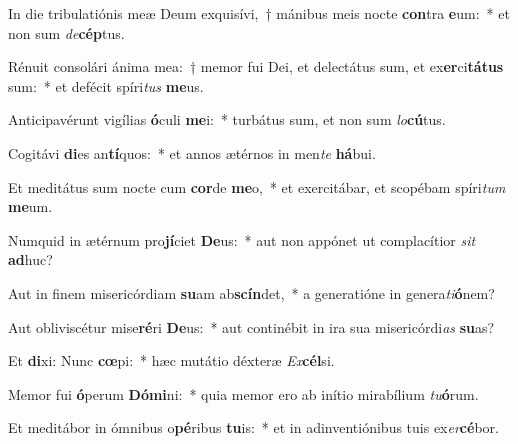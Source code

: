 \item In die tribulatiónis meæ Deum exquisívi,~† mánibus meis nocte \textbf{con}tra \textbf{e}um:~* et non sum \textit{de}\textbf{cép}tus.
\item Rénuit consolári ánima mea:~† memor fui Dei, et delectátus sum, et ex\textbf{er}ci\textbf{tá}\textbf{tus} sum:~* et defécit spíri\textit{tus} \textbf{me}us.
\item Anticipavérunt vigílias \textbf{ó}culi \textbf{me}i:~* turbátus sum, et non sum \textit{lo}\textbf{cú}tus.
\item Cogitávi \textbf{di}es an\textbf{tí}quos:~* et annos ætérnos in men\textit{te} \textbf{há}bui.
\item Et meditátus sum nocte cum \textbf{cor}de \textbf{me}o,~* et exercitábar, et scopébam spíri\textit{tum} \textbf{me}um.
\item Numquid in ætérnum pro\textbf{jí}ciet \textbf{De}us:~* aut non appónet ut complacítior \textit{sit} \textbf{ad}huc?
\item Aut in finem misericórdiam \textbf{su}am ab\textbf{scín}det,~* a generatióne in genera\textit{ti}\textbf{ó}nem?
\item Aut obliviscétur mise\textbf{ré}ri \textbf{De}us:~* aut continébit in ira sua misericórdi\textit{as} \textbf{su}as?
\item Et \textbf{di}xi: Nunc \textbf{cœ}pi:~* hæc mutátio déxteræ \textit{Ex}\textbf{cél}si.
\item Memor fui \textbf{ó}perum \textbf{Dó}\textbf{mi}ni:~* quia memor ero ab inítio mirabílium \textit{tu}\textbf{ó}rum.
\item Et meditábor in ómnibus o\textbf{pé}ribus \textbf{tu}is:~* et in adinventiónibus tuis ex\textit{er}\textbf{cé}bor.
